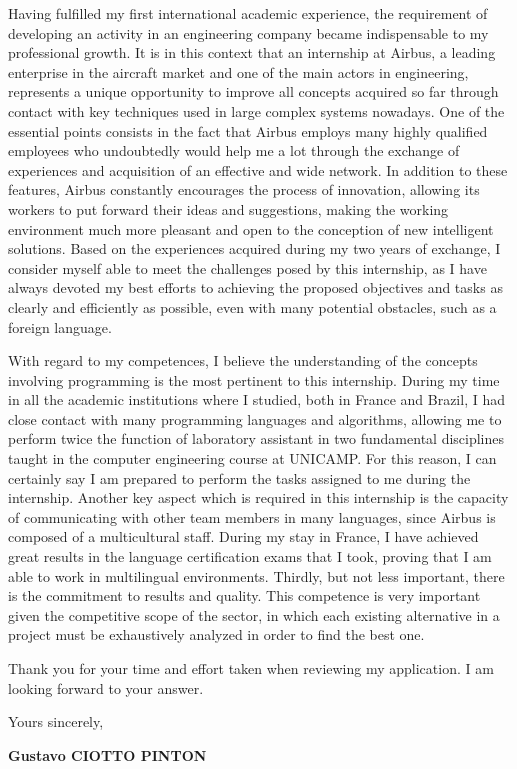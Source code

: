 \documentclass[12pt, a4paper]{article}
\begin{document}
\vspace{12pt}

Having fulfilled my first international academic experience, the requirement of
developing an activity in an engineering company became indispensable to my
professional growth. It is in this context that an internship at Airbus, a
leading enterprise in the aircraft market and one of the main actors in
engineering, represents a unique opportunity to improve all concepts acquired
so far through contact with key techniques used in large complex systems
nowadays.  One of the essential points consists in the fact that Airbus employs
many highly qualified employees who undoubtedly would help me a lot through
the exchange of experiences and acquisition of an effective and wide
network. In addition  to these features, Airbus constantly encourages
the process of innovation, allowing its workers to put forward their ideas and
suggestions, making the working environment much more pleasant and open to the
conception of new intelligent solutions. Based on the experiences acquired
during my two years of exchange, I consider myself able to meet the challenges
posed by this internship, as I have always devoted my best efforts to achieving
the proposed objectives and tasks as clearly and efficiently as possible, even with
many potential obstacles, such as a foreign language.


\vspace{12pt}

With regard to my competences,  I believe the understanding of the concepts
involving programming is the most pertinent to this internship. During my time
in all the academic institutions where I studied, both in France and Brazil, I
had close contact with many programming languages and algorithms, allowing me to perform
twice the function of laboratory assistant in two fundamental disciplines taught
in the computer engineering course at UNICAMP. For this reason, I can certainly
say I am prepared to perform the tasks assigned to me during the internship.
Another key aspect which is required in this internship is the capacity of
communicating with other team members in many languages, since Airbus is
composed of a multicultural staff. During my stay in France, I have achieved
great results in the language certification exams that I took, proving
that I am able to work in multilingual environments. Thirdly, but not less
important, there is the commitment to results and quality. This competence is very important given
the competitive scope of the sector,  in which each existing alternative  in a
project must be exhaustively analyzed in order to find the best one.


	
\vspace{12pt}

Thank you for your time and effort taken when reviewing my application. I am
looking forward to your answer.

\vspace{12pt}

Yours sincerely,

\begin{flushright}
\textbf{Gustavo CIOTTO PINTON}
\end{flushright}
\end{document}
